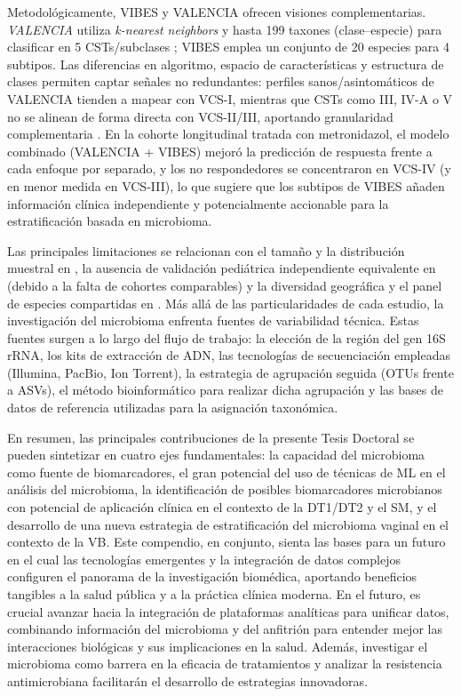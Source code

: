 Metodológicamente, VIBES y VALENCIA ofrecen visiones complementarias. \textit{VALENCIA} utiliza \textit{k-nearest neighbors} y hasta 199 taxones (clase–especie) para clasificar en 5 CSTs/subclases \cite{france2020valencia}; VIBES emplea un conjunto de 20 especies para 4 subtipos. Las diferencias en algoritmo, espacio de características y estructura de clases permiten captar señales no redundantes: perfiles sanos/asintomáticos de VALENCIA tienden a mapear con VCS-I, mientras que CSTs como III, IV-A o V no se alinean de forma directa con VCS-II/III, aportando granularidad complementaria \cite{ravel2011vaginal}. En la cohorte longitudinal tratada con metronidazol, el modelo combinado (VALENCIA + VIBES) mejoró la predicción de respuesta frente a cada enfoque por separado, y los no respondedores se concentraron en VCS-IV (y en menor medida en VCS-III), lo que sugiere que los subtipos de VIBES añaden información clínica independiente y potencialmente accionable para la estratificación basada en microbioma.



Las principales limitaciones se relacionan con el tamaño y la distribución muestral en \cite{paper1}, la ausencia de validación pediátrica independiente equivalente en \cite{paper2} (debido a la falta de cohortes comparables) y la diversidad geográfica y el panel de especies compartidas en \cite{paper3}. Más allá de las particularidades de cada estudio, la investigación del microbioma enfrenta fuentes de variabilidad técnica. Estas fuentes surgen a lo largo del flujo de trabajo: la elección de la región del gen 16S rRNA, los kits de extracción de ADN, las tecnologías de secuenciación empleadas (Illumina, PacBio, Ion Torrent), la estrategia de agrupación seguida (OTUs frente a ASVs), el método bioinformático para realizar dicha agrupación y las bases de datos de referencia utilizadas para la asignación taxonómica.

En resumen, las principales contribuciones de la presente Tesis Doctoral se pueden sintetizar en cuatro ejes fundamentales: la capacidad del microbioma como fuente de biomarcadores, el gran potencial del uso de técnicas de ML en el análisis del microbioma, la identificación de posibles biomarcadores microbianos con potencial de aplicación clínica en el contexto de la DT1/DT2 y el SM, y el desarrollo de una nueva estrategia de estratificación del microbioma vaginal en el contexto de la VB. Este compendio, en conjunto, sienta las bases para un futuro en el cual las tecnologías emergentes y la integración de datos complejos configuren el panorama de la investigación biomédica, aportando beneficios tangibles a la salud pública y a la práctica clínica moderna. En el futuro, es crucial avanzar hacia la integración de plataformas analíticas para unificar datos, combinando información del microbioma y del anfitrión para entender mejor las interacciones biológicas y sus implicaciones en la salud. Además, investigar el microbioma como barrera en la eficacia de tratamientos y analizar la resistencia antimicrobiana facilitarán el desarrollo de estrategias innovadoras.